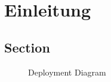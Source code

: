 \chapter{Einleitung}
\label{chapter:introduction}

\section{Section}

\begin{figure}
    \centering
    
    \caption{Deployment Diagram}
    \label{fig:flux_data_flow}
\end{figure}